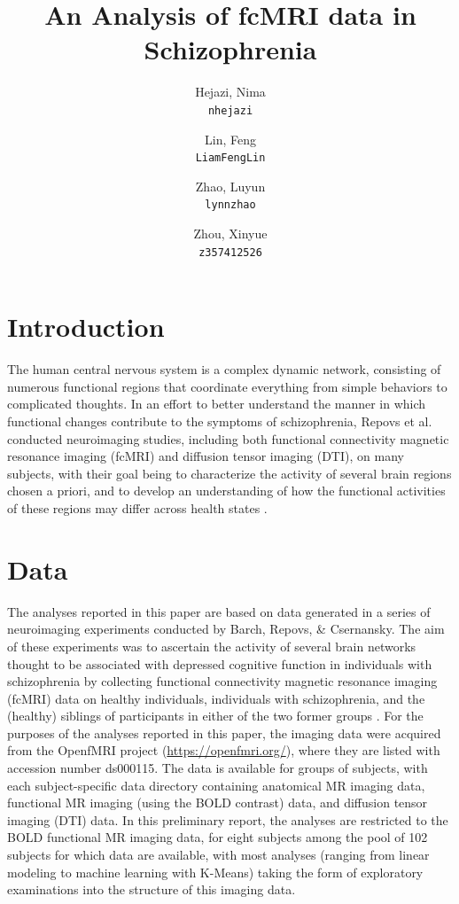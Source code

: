 \documentclass[11pt]{article}
\title{An Analysis of fcMRI data in Schizophrenia}
\author{
  Hejazi, Nima\\
  \texttt{nhejazi}
  \and
  Lin, Feng\\
  \texttt{LiamFengLin}
  \and
  Zhao, Luyun\\
  \texttt{lynnzhao}
  \and
  Zhou, Xinyue\\
  \texttt{z357412526}
}
\begin{document}
\maketitle


\section{Introduction}

The human central nervous system is a complex dynamic network, consisting of
numerous functional regions that coordinate everything from simple behaviors to
complicated thoughts. In an effort to better understand the manner in which
functional changes contribute to the symptoms of schizophrenia, Repovs et
al. conducted neuroimaging studies, including both functional connectivity
magnetic resonance imaging (fcMRI) and diffusion tensor imaging (DTI), on many
subjects, with their goal being to characterize the activity of several brain
regions chosen a priori, and to develop an understanding of how the functional 
activities of these regions may differ across health states \cite{repovs2011,
repovs2012}.

\section{Data}

The analyses reported in this paper are based on data generated in a series of
neuroimaging experiments conducted by Barch, Repovs, \& Csernansky. The aim of
these experiments was to ascertain the activity of several brain networks
thought to be associated with depressed cognitive function in individuals with
schizophrenia by collecting functional connectivity magnetic resonance imaging
(fcMRI) data on healthy individuals, individuals with schizophrenia, and the
(healthy) siblings of participants in either of the two former groups
\cite{repovs2012}. For the purposes of the analyses reported in this paper, 
the imaging
data were acquired from the OpenfMRI project (\url{https://openfmri.org/}), 
where they
are listed with accession number ds000115. The data is available for groups of
subjects, with each subject-specific data directory containing anatomical MR
imaging data, functional MR imaging (using the BOLD contrast) data, and
diffusion tensor imaging (DTI) data. In this preliminary report, the analyses
are restricted to the BOLD functional MR imaging data, for eight subjects among
the pool of 102 subjects for which data are available, with most analyses
(ranging from linear modeling to machine learning with K-Means) taking the form
of exploratory examinations into the structure of this imaging data.
\end{document}
